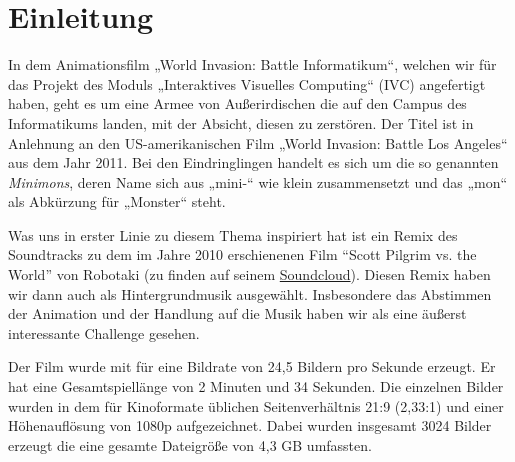 \section{Einleitung}

In dem Animationsfilm „World Invasion: Battle Informatikum“, welchen wir für das Projekt des Moduls „Interaktives Visuelles Computing“ (IVC) angefertigt haben, geht es um eine Armee von Außerirdischen die auf den Campus des Informatikums landen, mit der Absicht, diesen zu zerstören. Der Titel ist in Anlehnung an den US-amerikanischen Film „World Invasion: Battle Los Angeles“ aus dem Jahr 2011. Bei den Eindringlingen handelt es sich um die so genannten \textit{Minimons}, deren Name sich aus „mini-“ wie klein zusammensetzt und das „mon“ als Abkürzung für „Monster“ steht.

Was uns in erster Linie zu diesem Thema inspiriert hat ist ein Remix des Soundtracks zu dem im Jahre 2010 erschienenen Film ``Scott Pilgrim vs. the World'' von Robotaki (zu finden auf seinem \href{https://soundcloud.com/robotaki/scott-pilgrim-vs-the-world-fight-robotaki-remix}{Soundcloud}). Diesen Remix haben wir dann auch als Hintergrundmusik ausgewählt. Insbesondere das Abstimmen der Animation und der Handlung auf die Musik haben wir als eine äußerst interessante Challenge gesehen.

Der Film wurde mit \Povray für eine Bildrate von 24,5 Bildern pro Sekunde erzeugt. Er hat eine Gesamtspiellänge von 2 Minuten und 34 Sekunden. Die einzelnen Bilder wurden in dem für Kinoformate üblichen Seitenverhältnis 21:9 (2,33:1) und einer Höhenauflösung von 1080p aufgezeichnet. Dabei wurden insgesamt 3024 Bilder erzeugt die eine gesamte Dateigröße von 4,3 GB umfassten.
